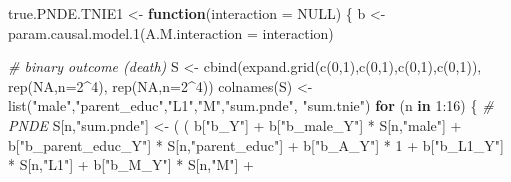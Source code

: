 \documentclass[
]{book}
\newenvironment{Shaded}{\begin{snugshade}}{\end{snugshade}}
\newcommand{\AttributeTok}[1]{\textcolor[rgb]{0.77,0.63,0.00}{#1}}
\newcommand{\CommentTok}[1]{\textcolor[rgb]{0.56,0.35,0.01}{\textit{#1}}}
\newcommand{\ConstantTok}[1]{\textcolor[rgb]{0.00,0.00,0.00}{#1}}
\newcommand{\ControlFlowTok}[1]{\textcolor[rgb]{0.13,0.29,0.53}{\textbf{#1}}}
\newcommand{\DecValTok}[1]{\textcolor[rgb]{0.00,0.00,0.81}{#1}}
\newcommand{\FunctionTok}[1]{\textcolor[rgb]{0.00,0.00,0.00}{#1}}
\newcommand{\NormalTok}[1]{#1}
\newcommand{\OtherTok}[1]{\textcolor[rgb]{0.56,0.35,0.01}{#1}}
\newcommand{\SpecialCharTok}[1]{\textcolor[rgb]{0.00,0.00,0.00}{#1}}
\newcommand{\StringTok}[1]{\textcolor[rgb]{0.31,0.60,0.02}{#1}}
\begin{document}
\begin{Shaded}
\begin{Highlighting}[]
\NormalTok{true.PNDE.TNIE1 }\OtherTok{\textless{}{-}} \ControlFlowTok{function}\NormalTok{(}\AttributeTok{interaction =} \ConstantTok{NULL}\NormalTok{) \{}
\NormalTok{  b }\OtherTok{\textless{}{-}} \FunctionTok{param.causal.model.1}\NormalTok{(}\AttributeTok{A.M.interaction =}\NormalTok{ interaction)}
  
  \CommentTok{\# binary outcome (death)}
\NormalTok{  S }\OtherTok{\textless{}{-}} \FunctionTok{cbind}\NormalTok{(}\FunctionTok{expand.grid}\NormalTok{(}\FunctionTok{c}\NormalTok{(}\DecValTok{0}\NormalTok{,}\DecValTok{1}\NormalTok{),}\FunctionTok{c}\NormalTok{(}\DecValTok{0}\NormalTok{,}\DecValTok{1}\NormalTok{),}\FunctionTok{c}\NormalTok{(}\DecValTok{0}\NormalTok{,}\DecValTok{1}\NormalTok{),}\FunctionTok{c}\NormalTok{(}\DecValTok{0}\NormalTok{,}\DecValTok{1}\NormalTok{)), }\FunctionTok{rep}\NormalTok{(}\ConstantTok{NA}\NormalTok{,}\AttributeTok{n=}\DecValTok{2}\SpecialCharTok{\^{}}\DecValTok{4}\NormalTok{), }\FunctionTok{rep}\NormalTok{(}\ConstantTok{NA}\NormalTok{,}\AttributeTok{n=}\DecValTok{2}\SpecialCharTok{\^{}}\DecValTok{4}\NormalTok{))}
  \FunctionTok{colnames}\NormalTok{(S) }\OtherTok{\textless{}{-}} \FunctionTok{list}\NormalTok{(}\StringTok{"male"}\NormalTok{,}\StringTok{"parent\_educ"}\NormalTok{,}\StringTok{"L1"}\NormalTok{,}\StringTok{"M"}\NormalTok{,}\StringTok{"sum.pnde"}\NormalTok{, }\StringTok{"sum.tnie"}\NormalTok{)}
  \ControlFlowTok{for}\NormalTok{ (n }\ControlFlowTok{in} \DecValTok{1}\SpecialCharTok{:}\DecValTok{16}\NormalTok{) \{}
    \CommentTok{\# PNDE }
\NormalTok{    S[n,}\StringTok{"sum.pnde"}\NormalTok{] }\OtherTok{\textless{}{-}}\NormalTok{ ( ( b[}\StringTok{"b\_Y"}\NormalTok{] }\SpecialCharTok{+} 
\NormalTok{                             b[}\StringTok{"b\_male\_Y"}\NormalTok{] }\SpecialCharTok{*}\NormalTok{ S[n,}\StringTok{"male"}\NormalTok{] }\SpecialCharTok{+} 
\NormalTok{                             b[}\StringTok{"b\_parent\_educ\_Y"}\NormalTok{] }\SpecialCharTok{*}\NormalTok{ S[n,}\StringTok{"parent\_educ"}\NormalTok{] }\SpecialCharTok{+} 
\NormalTok{                             b[}\StringTok{"b\_A\_Y"}\NormalTok{] }\SpecialCharTok{*} \DecValTok{1} \SpecialCharTok{+} 
\NormalTok{                             b[}\StringTok{"b\_L1\_Y"}\NormalTok{] }\SpecialCharTok{*}\NormalTok{ S[n,}\StringTok{"L1"}\NormalTok{] }\SpecialCharTok{+}
\NormalTok{                             b[}\StringTok{"b\_M\_Y"}\NormalTok{] }\SpecialCharTok{*}\NormalTok{ S[n,}\StringTok{"M"}\NormalTok{] }\SpecialCharTok{+}

\end{Highlighting}
\end{Shaded}
\end{document}
